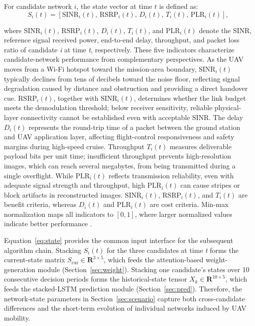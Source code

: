 \documentclass[remotesensing,article,submit,moreauthors]{Definitions/mdpi}
\begin{document}
For candidate network $i$, the state vector at time $t$ is defined as:
\begin{equation}
S_i(t)=\left[\mathrm{SINR}_i(t),\,\mathrm{RSRP}_i(t),\,D_i(t),\,T_i(t),\,\mathrm{PLR}_i(t)\right],
\label{eq:state}
\end{equation}

where $\mathrm{SINR}_i(t)$, $\mathrm{RSRP}_i(t)$, $D_i(t)$, $T_i(t)$, and $\mathrm{PLR}_i(t)$ denote the SINR, reference signal received power, end-to-end delay, throughput, and packet loss ratio of candidate \textit{i} at time \textit{t}, respectively. These five indicators characterize candidate-network performance from complementary perspectives. As the UAV moves from a Wi-Fi hotspot toward the mission-area boundary, $\mathrm{SINR}_i(t)$ typically declines from tens of decibels toward the noise floor, reflecting signal degradation caused by distance and obstruction and providing a direct handover cue. $\mathrm{RSRP}_i(t)$, together with $\mathrm{SINR}_i(t)$, determines whether the link budget meets the demodulation threshold; below receiver sensitivity, reliable physical-layer connectivity cannot be established even with acceptable SINR. The delay $D_i(t)$ represents the round-trip time of a packet between the ground station and UAV application layer, affecting flight-control responsiveness and safety margins during high-speed cruise. Throughput $T_i(t)$ measures deliverable payload bits per unit time; insufficient throughput prevents high-resolution images, which can reach several megabytes, from being transmitted during a single overflight. While $\mathrm{PLR}_i(t)$ reflects transmission reliability, even with adequate signal strength and throughput, high $\mathrm{PLR}_i(t)$ can cause stripes or block artifacts in reconstructed images. $\mathrm{SINR}_i(t)$, $\mathrm{RSRP}_i(t)$, and $T_i(t)$ are benefit criteria, whereas $D_i(t)$ and $\mathrm{PLR}_i(t)$ are cost criteria. Min-max normalization maps all indicators to $[0,1]$, where larger normalized values indicate better performance \citep{ref11}.

Equation~\eqref{eq:state} provides the common input interface for the subsequent algorithm chain. Stacking $S_i(t)$ for the three candidates at time \textit{t} forms the current-state matrix $S_{\mathrm{cur}}\in\mathbf{R}^{3\times5}$, which feeds the attention-based weight-generation module (Section~\ref{sec:weight}). Stacking one candidate's states over 10 consecutive decision periods forms the historical-state tensor $X_k\in\mathbf{R}^{10\times5}$, which feeds the stacked-LSTM prediction module (Section~\ref{sec:pred}). Therefore, the network-state parameters in Section~\ref{sec:scenario} capture both cross-candidate differences and the short-term evolution of individual networks induced by UAV mobility.
\end{document}
